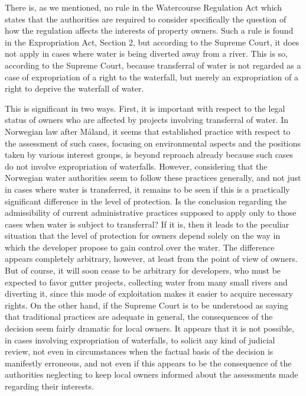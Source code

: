 There is, as we mentioned, no rule in the Watercourse Regulation Act which states that the authorities are required to consider specifically the question of how the regulation affects the interests of property owners. Such a rule is found in the Expropriation Act, Section 2, but according to the Supreme Court, it does not apply in cases where water is being diverted away from a river. This is so, according to the Supreme Court, because transferral of water is not regarded as a case of expropriation of a right to the waterfall, but merely an expropriation of a right to deprive the waterfall of water.

This is significant in two ways. First, it is important with respect to the legal status of owners who are affected by projects involving transferral of water. In Norwegian law after Måland, it seems that established practice with respect to the assessment of such cases, focusing on environmental aspects and the positions taken by various interest groups, is beyond reproach already because such cases do not involve expropriation of waterfalls. However, considering that the Norwegian water authorities seem to follow these practices generally, and not just in cases where water is transferred, it remains to be seen if this is a practically significant difference in the level of protection. Is the conclusion regarding the admissibility of current administrative practices supposed to apply only to those cases when water is subject to transferral? If it is, then it leads to the peculiar situation that the level of protection for owners depend solely on the way in which the developer propose to gain control over the water. The difference appears completely arbitrary, however, at least from the point of view of owners. But of course, it will soon cease to be arbitrary for developers, who must be expected to favor gutter projects, collecting water from many small rivers and diverting it, since this mode of exploitation makes it easier to acquire necessary rights. On the other hand, if the Supreme Court is to be understood as saying that traditional practices are adequate in general, the consequences of the decision seem fairly dramatic for local owners. It appears that it is not possible, in cases involving expropriation of waterfalls, to solicit any kind of judicial review, not even in circumstances when the factual basis of the decision is manifestly erroneous, and not even if this appears to be the consequence of the authorities neglecting to keep local owners informed about the assessments made regarding their interests.

